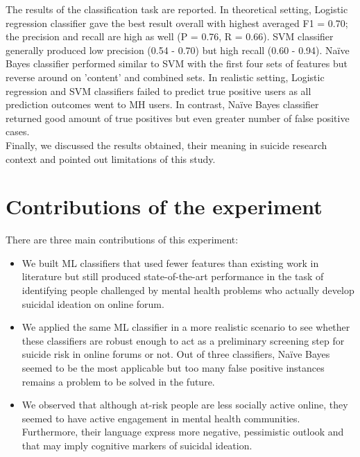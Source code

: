 The results of the classification task are reported. In theoretical setting, Logistic regression classifier gave the best result overall with highest averaged F1 = 0.70; the precision and recall are high as well (P = 0.76, R = 0.66). SVM classifier generally produced low precision (0.54 - 0.70) but high recall (0.60 - 0.94). Na\"ive Bayes classifier performed similar to SVM with the first four sets of features but reverse around on 'content' and combined sets. In realistic setting, Logistic regression and SVM classifiers failed to predict true positive users as all prediction outcomes went to MH users. In contrast, Na\"ive Bayes classifier returned good amount of true positives but even greater number of false positive cases.\\
Finally, we discussed the results obtained, their meaning in suicide research context and pointed out limitations of this study.\\ 
\section{Contributions of the experiment}
There are three main contributions of this experiment:
\begin{itemize}
\item We built ML classifiers that used fewer features than existing work in literature but still produced state-of-the-art performance in the task of identifying people challenged by mental health problems who actually develop suicidal ideation on online forum. 
\item We applied the same ML classifier in a more realistic scenario to see whether these classifiers are robust enough to act as a preliminary screening step for suicide risk in online forums or not. Out of three classifiers, Na\"ive Bayes seemed to be the most applicable but too many false positive instances remains a problem to be solved in the future.
\item We observed that although at-risk people are less socially active online, they seemed to have active engagement in mental health communities. Furthermore, their language express more negative, pessimistic outlook and that may imply cognitive markers of suicidal ideation.
\end{itemize}
